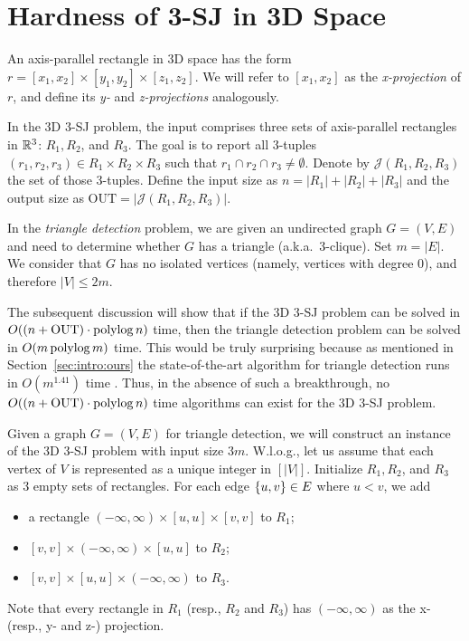 \documentclass[acmsmall,review,anonymous]{acmart}
\def\vgap{\vspace{1mm}}
\def\J{\mathcal{J}}
\def\out{\mathrm{OUT}}
\begin{document}
{{{\section{Hardness of 3-SJ in 3D Space} \label{app:lb-cond}

An axis-parallel rectangle in 3D space has the form $r = [x_1, x_2] \times [y_1, y_2] \times [z_1, z_2]$. We will refer to $[x_1, x_2]$ as the {\em x-projection} of $r$, and define its {\em y-} and {\em z-projections} analogously.


\vgap

In the 3D 3-SJ problem, the input comprises three sets of axis-parallel rectangles in $\mathbb{R}^3$: $R_1, R_2$, and $R_3$. The goal is to report all 3-tuples $(r_1, r_2, r_3) \in R_1 \times R_2 \times R_3$ such that $r_1 \cap r_2 \cap r_3 \neq \emptyset$. Denote by $\J(R_1, R_2, R_3)$ the set of those 3-tuples. Define the input size as $n = |R_1| + |R_2| + |R_3|$ and the output size as $\out = |\J(R_1, R_2, R_3)|$.

\vgap

In the {\em triangle detection} problem, we are given an undirected graph $G = (V, E)$ and need to determine whether $G$ has a triangle (a.k.a.\, 3-clique). Set $m = |E|$. We consider that $G$ has no isolated vertices (namely, vertices with degree 0), and therefore $|V| \le 2m$.

\vgap

The subsequent discussion will show that if the 3D 3-SJ problem can be solved in $O((n + \out) \cdot \polylog n)$ time, then the triangle detection problem can be solved in $O(m \operatorname*{polylog} m)$ time. This would be truly surprising because as mentioned in Section~\ref{sec:intro:ours} the state-of-the-art algorithm for triangle detection runs in $O(m^{1.41})$ time \cite{ayz97}. Thus, in the absence of such a breakthrough, no $O((n + \out) \cdot \polylog n)$ time algorithms can exist for the 3D 3-SJ problem.

\vgap

Given a graph $G = (V,E)$ for triangle detection, we will construct an instance of the 3D 3-SJ problem with input size $3m$. W.l.o.g., let us assume that each vertex of $V$ is represented as a unique integer in $[|V|]$. Initialize $R_1, R_2$, and $R_3$ as 3 empty sets of rectangles. For each edge $\{u, v\}\in E$ where $u < v$, we add
\begin{itemize}
    \item a rectangle $(-\infty, \infty) \times [u,u] \times [v,v]$ to $R_1$;
    \item $[v,v] \times(-\infty, \infty)\times [u,u]$ to $R_2$;
    \item $[v,v] \times [u,u] \times(-\infty, \infty) $ to $R_3$.
\end{itemize}
Note that every rectangle in $R_1$ (resp., $R_2$ and $R_3$) has $(-\infty, \infty)$ as the x- (resp., y- and z-) projection.

}}}
\end{document}
